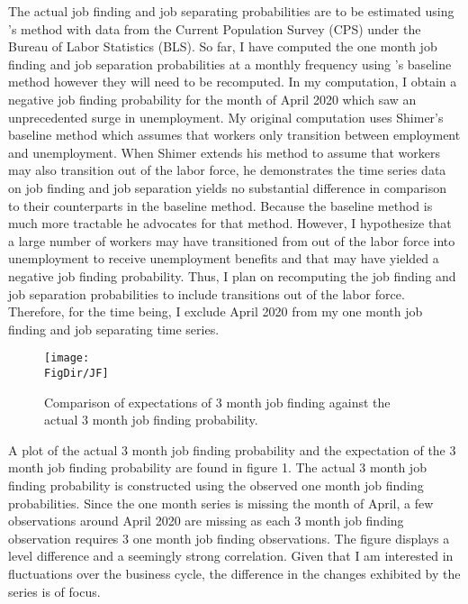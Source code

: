 \documentclass[titlepage]{\econtex}\providecommand{\texname}{Dissertation-Proposal}
\providecommand{\FigDir}{Figures}
\begin{document}
The actual job finding and job separating probabilities are to be estimated using \cite{shimer2012reassessing}'s method with data from the Current Population Survey (CPS) under the Bureau of Labor Statistics (BLS).  So far, I have computed the one month job finding and job separation probabilities at a monthly frequency using \cite{shimer2012reassessing}'s baseline method however they will need to be recomputed. In my computation, I obtain a negative job finding probability for the month of April 2020 which saw an unprecedented surge in unemployment. My original computation uses Shimer's baseline method which assumes that workers only transition between employment and unemployment. When Shimer extends his method to assume that workers may also transition out of the labor force, he demonstrates the time series data on job finding and job separation yields no substantial difference in comparison to their counterparts in the baseline method. Because the baseline method is much more tractable he advocates for that method. However, I hypothesize that a large number of workers may have transitioned from out of the labor force into unemployment to receive unemployment benefits and that may have yielded a negative job finding probability. Thus, I plan on recomputing the job finding and job separation probabilities to include transitions out of the labor force. Therefore, for the time being, I exclude April 2020 from my one month job finding and job separating time series. \\

\begin{figure}{}
    \centering\texttt{[image: \\FigDir/JF]}
    \caption{Comparison of expectations of 3 month job finding  against the actual 3 month job finding probability. }
\end{figure} 



A plot of the actual 3 month job finding probability and the expectation of the 3 month job finding probability are found in figure 1. The actual 3 month job finding probability is constructed using the observed one month job finding probabilities. Since the one month series is missing the month of April, a few observations around April 2020 are missing as each 3 month job finding observation requires 3 one month job finding observations. The figure displays a level difference and a seemingly strong correlation. Given that I am interested in fluctuations over the business cycle, the difference in the changes exhibited by the series is of focus. \\
\end{document}
